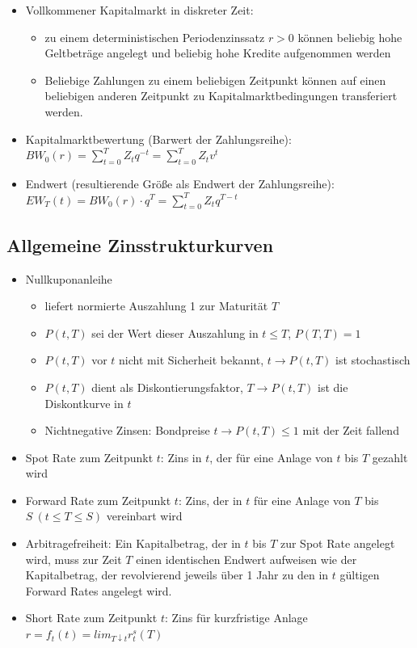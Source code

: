 \documentclass[12pt]{report}
\theoremstyle{dotless}
\theoremstyle{definition}
\begin{document}
\begin{itemize}
	\item Vollkommener Kapitalmarkt in diskreter Zeit:
	\begin{itemize}
		\item zu einem deterministischen Periodenzinssatz $r>0$ k\"onnen beliebig hohe Geltbetr\"age angelegt und beliebig hohe Kredite aufgenommen werden
		\item Beliebige Zahlungen zu einem beliebigen Zeitpunkt k\"onnen auf einen beliebigen anderen Zeitpunkt zu Kapitalmarktbedingungen transferiert werden.
	\end{itemize}
	\item Kapitalmarktbewertung (Barwert der Zahlungsreihe): \\ $BW_0(r) = \sum_{t=0}^T Z_t q^{-t} = \sum_{t=0}^T Z_tv^t$
	\item Endwert (resultierende Gr\"o{\ss}e als Endwert der Zahlungsreihe): \\ $EW_T(t) = BW_0(r)\cdot q^T = \sum_{t=0}^T Z_t q^{T-t}$
\end{itemize}

\subsection{Allgemeine Zinsstrukturkurven}

\begin{itemize}
	\item Nullkuponanleihe
	\begin{itemize}
		\item liefert normierte Auszahlung 1 zur Maturit\"at $T$
		\item $P(t,T)$ sei der Wert dieser Auszahlung in $t \leq T$, $P(T,T)=1$
		\item $P(t,T)$ vor $t$ nicht mit Sicherheit bekannt, $t \rightarrow P(t,T)$ ist stochastisch
		\item $P(t,T)$ dient als Diskontierungsfaktor, $T \rightarrow P(t,T)$ ist die Diskontkurve in $t$
		\item Nichtnegative Zinsen: Bondpreise $t \rightarrow P(t,T) \leq 1$ mit der Zeit fallend
	\end{itemize}
	\item Spot Rate zum Zeitpunkt $t$: Zins in $t$, der f\"ur eine Anlage von $t$ bis $T$ gezahlt wird
	\item Forward Rate zum Zeitpunkt $t$: Zins, der in $t$ f\"ur eine Anlage von $T$ bis $S \ (t \leq T \leq S)$ vereinbart wird
	\item Arbitragefreiheit: Ein Kapitalbetrag, der in $t$ bis $T$ zur Spot Rate angelegt wird, muss zur Zeit $T$ einen identischen Endwert aufweisen wie der Kapitalbetrag, der revolvierend jeweils \"uber 1 Jahr zu den in $t$ g\"ultigen Forward Rates angelegt wird.
	\item Short Rate zum Zeitpunkt $t$: Zins f\"ur kurzfristige Anlage $r = f_t(t) = lim_{T \downarrow t} r_t^s(T)$
\end{itemize}
\end{document}

